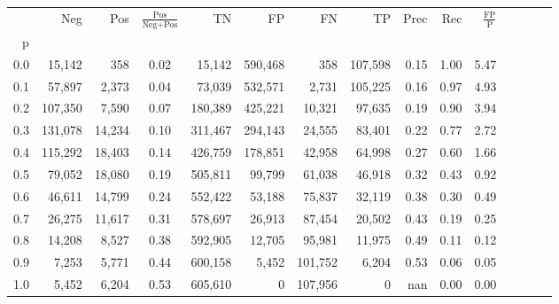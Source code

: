 \begin{tabular}{rrrcrrrrrrrrrrr}
\toprule
{} &      Neg &     Pos & $\frac{\text{Pos}}{\text{Neg}+\text{Pos}}$ &       TN &       FP &       FN &       TP &  Prec &   Rec & $\frac{\text{FP}}{\text{P}}$ \\
p   &          &         &                                            &          &          &          &          &       &       &                              \\
\midrule
0.0 &   15,142 &     358 &                                       0.02 &   15,142 &  590,468 &      358 &  107,598 &  0.15 &  1.00 &                         5.47 \\
0.1 &   57,897 &   2,373 &                                       0.04 &   73,039 &  532,571 &    2,731 &  105,225 &  0.16 &  0.97 &                         4.93 \\
0.2 &  107,350 &   7,590 &                                       0.07 &  180,389 &  425,221 &   10,321 &   97,635 &  0.19 &  0.90 &                         3.94 \\
0.3 &  131,078 &  14,234 &                                       0.10 &  311,467 &  294,143 &   24,555 &   83,401 &  0.22 &  0.77 &                         2.72 \\
0.4 &  115,292 &  18,403 &                                       0.14 &  426,759 &  178,851 &   42,958 &   64,998 &  0.27 &  0.60 &                         1.66 \\
0.5 &   79,052 &  18,080 &                                       0.19 &  505,811 &   99,799 &   61,038 &   46,918 &  0.32 &  0.43 &                         0.92 \\
0.6 &   46,611 &  14,799 &                                       0.24 &  552,422 &   53,188 &   75,837 &   32,119 &  0.38 &  0.30 &                         0.49 \\
0.7 &   26,275 &  11,617 &                                       0.31 &  578,697 &   26,913 &   87,454 &   20,502 &  0.43 &  0.19 &                         0.25 \\
0.8 &   14,208 &   8,527 &                                       0.38 &  592,905 &   12,705 &   95,981 &   11,975 &  0.49 &  0.11 &                         0.12 \\
0.9 &    7,253 &   5,771 &                                       0.44 &  600,158 &    5,452 &  101,752 &    6,204 &  0.53 &  0.06 &                         0.05 \\
1.0 &    5,452 &   6,204 &                                       0.53 &  605,610 &        0 &  107,956 &        0 &   nan &  0.00 &                         0.00 \\
\bottomrule
\end{tabular}

